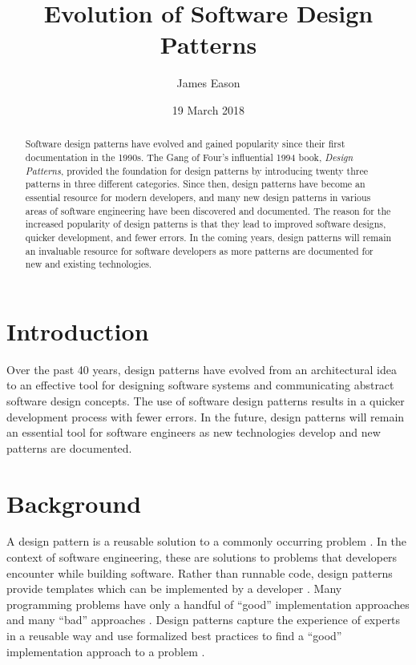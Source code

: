 \documentclass[11pt]{article}
\title{Evolution of Software Design Patterns}
\author{James Eason}
\date{19 March 2018}
\begin{document}
\maketitle

\thispagestyle{empty}

\begin{abstract}
Software design patterns have evolved and gained popularity since their first documentation in the 1990s. The Gang of Four's influential 1994 book, \textit{Design Patterns}, provided the foundation for design patterns by introducing twenty three patterns in three different categories. Since then, design patterns have become an essential resource for modern developers, and many new design patterns in various areas of software engineering have been discovered and documented. The reason for the increased popularity of design patterns is that they lead to improved software designs, quicker development, and fewer errors. In the coming years, design patterns will remain an invaluable resource for software developers as more patterns are documented for new and existing technologies.
\end{abstract}



\doublespacing

\section{Introduction}

Over the past 40 years, design patterns have evolved from an architectural idea to an effective tool for designing software systems and communicating abstract software design concepts. The use of software design patterns results in a quicker development process with fewer errors.  In the future, design patterns will remain an essential tool for software engineers as new technologies develop and new patterns are documented.

\section{Background}

A design pattern is a reusable solution to a commonly occurring problem \cite{clarke2016}. In the context of software engineering, these are solutions to problems that developers encounter while building software. Rather than runnable code, design patterns provide templates which can be implemented by a developer  \cite{clarke2016}. Many programming problems have only a handful of ``good''  implementation approaches and many ``bad'' approaches \cite{agerbo1998}. Design patterns capture the experience of experts in a reusable way and use formalized best practices to find a ``good'' implementation approach to a problem  \cite{agerbo1998}.
\end{document}
